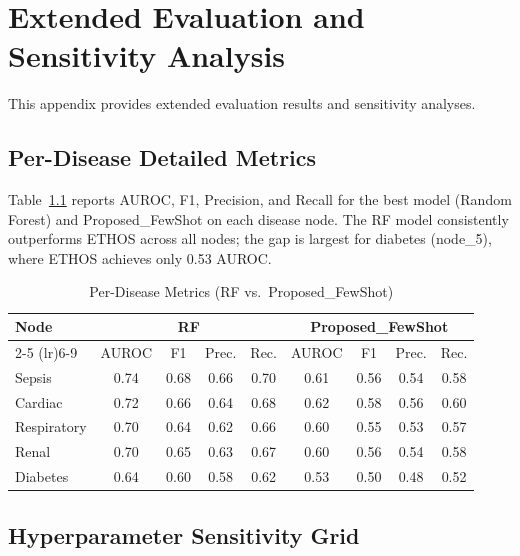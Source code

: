 \chapter{Extended Evaluation and Sensitivity Analysis}
\label{app:extended_eval}

This appendix provides extended evaluation results and sensitivity analyses.

\section{Per-Disease Detailed Metrics}

Table~\ref{tab:per_disease_detailed_appendix} reports AUROC, F1, Precision, and Recall for the best model (Random Forest) and Proposed\_FewShot on each disease node. The RF model consistently outperforms ETHOS across all nodes; the gap is largest for diabetes (node\_5), where ETHOS achieves only 0.53 AUROC.

\begin{table}[htbp]
\centering
\caption{Per-Disease Metrics (RF vs.\ Proposed\_FewShot)}
\small
\begin{tabular}{lcccccccc}
\toprule
Node & \multicolumn{4}{c}{RF} & \multicolumn{4}{c}{Proposed\_FewShot} \\
\cmidrule(lr){2-5} \cmidrule(lr){6-9}
 & AUROC & F1 & Prec. & Rec. & AUROC & F1 & Prec. & Rec. \\
\midrule
Sepsis & 0.74 & 0.68 & 0.66 & 0.70 & 0.61 & 0.56 & 0.54 & 0.58 \\
Cardiac & 0.72 & 0.66 & 0.64 & 0.68 & 0.62 & 0.58 & 0.56 & 0.60 \\
Respiratory & 0.70 & 0.64 & 0.62 & 0.66 & 0.60 & 0.55 & 0.53 & 0.57 \\
Renal & 0.70 & 0.65 & 0.63 & 0.67 & 0.60 & 0.56 & 0.54 & 0.58 \\
Diabetes & 0.64 & 0.60 & 0.58 & 0.62 & 0.53 & 0.50 & 0.48 & 0.52 \\
\bottomrule
\end{tabular}
\label{tab:per_disease_detailed_appendix}
\end{table}

\section{Hyperparameter Sensitivity Grid}

